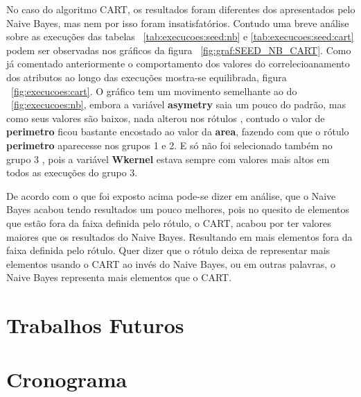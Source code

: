 No caso do algoritmo CART, os resultados foram diferentes dos  apresentados pelo Naive Bayes, mas nem por isso foram insatisfatórios. Contudo uma breve análise sobre as execuções das tabelas ~\ref{tab:execucoes:seed:nb} e \ref{tab:execucoes:seed:cart} podem ser observadas nos gráficos da figura ~\ref{fig:graf:SEED_NB_CART}. Como já comentado anteriormente o comportamento dos valores do correlecioanamento dos atributos ao longo das execuções mostra-se equilibrada, figura ~\ref{fig:execucoes:cart}. O gráfico tem um movimento semelhante ao do ~\ref{fig:execucoes:nb}, embora a variável \textbf{asymetry} saia um pouco do padrão, mas como seus valores são baixos, nada alterou nos rótulos , contudo  o valor de \textbf{perimetro} ficou bastante encostado ao valor da \textbf{area}, fazendo com que o rótulo \textbf{perimetro} aparecesse nos grupos 1 e 2. E só não foi selecionado também no grupo 3 , pois  a variável \textbf{Wkernel} estava sempre com valores mais altos em todos as execuções do grupo 3.

De acordo com o que foi exposto acima pode-se dizer em análise, que o Naive Bayes acabou tendo resultados um pouco melhores, pois no quesito de elementos que estão fora da faixa definida pelo rótulo, o CART, acabou por ter valores maiores que os resultados do Naive Bayes. Resultando em mais elementos fora da faixa definida pelo rótulo. Quer dizer que o rótulo deixa de representar mais elementos usando o CART ao invés do Naive Bayes, ou em outras palavras, o Naive Bayes representa mais elementos que o CART.



\section*{Trabalhos Futuros}

\lipsum[85] 

\section*{Cronograma}

\lipsum[85] 
